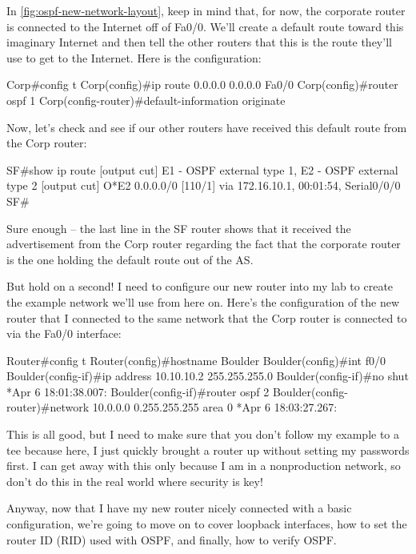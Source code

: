 In \cref{fig:ospf-new-network-layout}, keep in mind that, for now, the corporate router is connected to the Internet
off of Fa0/0. We'll create a default route toward this imaginary
Internet and then tell the other routers that this is the route they'll
use to get to the Internet. Here is the configuration:

\begin{cli}
Corp#config t
Corp(config)#ip route 0.0.0.0 0.0.0.0 Fa0/0
Corp(config)#router ospf 1
Corp(config-router)#default-information originate
\end{cli}

Now, let's check and see if our other routers have received this default
route from the Corp router:

\begin{cli}
SF#show ip route
[output cut]
E1 - OSPF external type 1, E2 - OSPF external type 2
[output cut]
O*E2 0.0.0.0/0 [110/1] via 172.16.10.1, 00:01:54, Serial0/0/0
SF#
\end{cli}

Sure enough -- the last line in the SF router shows that it received the
advertisement from the Corp router regarding the fact that the corporate
router is the one holding the default route out of the AS.

But hold on a second! I need to configure our new router into my lab to
create the example network we'll use from here on. Here's the
configuration of the new router that I connected to the same network
that the Corp router is connected to via the Fa0/0 interface:

\begin{cli}
Router#config t
Router(config)#hostname Boulder
Boulder(config)#int f0/0
Boulder(config-if)#ip address 10.10.10.2 255.255.255.0
Boulder(config-if)#no shut
*Apr  6 18:01:38.007: %
Boulder(config-if)#router ospf 2
Boulder(config-router)#network 10.0.0.0 0.255.255.255 area 0
*Apr  6 18:03:27.267: %
\end{cli}

This is all good, but I need to make sure that you don't follow my
example to a tee because here, I just quickly brought a router up
without setting my passwords first. I can get away with this
only because I am in a nonproduction network, so don't do this in the
real world where security is key!

Anyway, now that I have my new router nicely connected with a basic
configuration, we're going to move on to cover loopback interfaces, how
to set the router ID (RID) used with OSPF, and finally, how to verify
OSPF.



